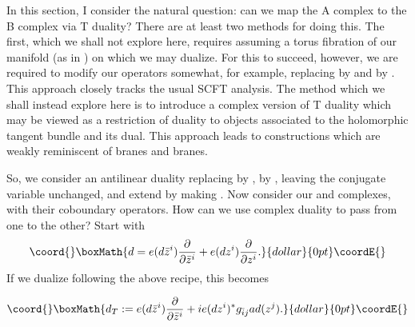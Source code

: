 \documentclass[a4paper,11pt]{amsart}
\providecommand{\db}{\bar{\partial}}
\begin{document}
In this section, I consider the natural question: can we map the A complex to 
the B complex via T duality? 
 There are at least two methods for doing this. The first, which we shall not
 explore here, requires assuming a torus fibration of our manifold (as in
  \cite{SYZ}) on which we may \coordHE{} dualize. For this to succeed, however, we are 
  required to modify our operators somewhat, for example, replacing \myHighlight{$\db$}\coordHE{} by
   \coordHE{} 
  and \myHighlight{$\partial$}\coordHE{} by \coordHE{}.
  This approach closely tracks the usual SCFT analysis.
The method which we shall instead explore here is to introduce a complex 
version of
 T duality which may be viewed as a restriction of \coordHE{} duality to objects
 associated to the holomorphic tangent bundle and its dual. This approach leads
 to constructions which are weakly reminiscent of \coordHE{} branes and \coordHE{}
  branes. 

So, we consider an antilinear \coordHE{} duality replacing 
\coordHE{} by 
\coordHE{}, \coordHE{} by \coordHE{}, leaving the conjugate variable
 unchanged, 
 and extend by making \coordHE{}. Now consider our \coordHE{} and \coordHE{} complexes, with
  their coboundary operators.  
How can we use complex \coordHE{} duality to pass from one to the other? 
Start with 
$$\coord{}\boxMath{d = 
e(d\bar z^i)\frac{\partial}{\partial \bar z^i}
 + e(dz^i)\frac{\partial}{\partial z^i}.}{dollar}{0pt}\coordE{}$$
If we \coordHE{} dualize following the above recipe, this becomes 

$$\coord{}\boxMath{d_T:=e(d\bar z^i)\frac{\partial}{\partial \bar z^i} + ie(dz^i)^*g_{\bar i j}ad(z^j).}{dollar}{0pt}\coordE{}$$
\end{document}
